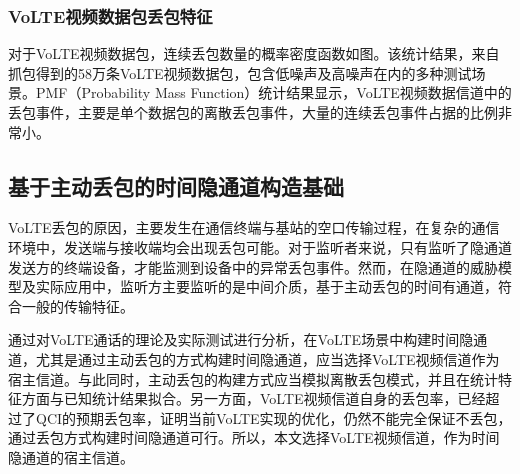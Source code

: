 \subsubsection{VoLTE视频数据包丢包特征}
\label{chap:backinfo:volte:packets:dropout}

对于VoLTE视频数据包，连续丢包数量的概率密度函数如图。该统计结果，来自抓包得到的58万条VoLTE视频数据包，包含低噪声及高噪声在内的多种测试场景。PMF（Probability Mass Function）统计结果显示，VoLTE视频数据信道中的丢包事件，主要是单个数据包的离散丢包事件，大量的连续丢包事件占据的比例非常小。

\subsection{基于主动丢包的时间隐通道构造基础}
\label{chap:backinfo:volte:scheme}
VoLTE丢包的原因，主要发生在通信终端与基站的空口传输过程，在复杂的通信环境中，发送端与接收端均会出现丢包可能。对于监听者来说，只有监听了隐通道发送方的终端设备，才能监测到设备中的异常丢包事件。然而，在隐通道的威胁模型及实际应用中，监听方主要监听的是中间介质，基于主动丢包的时间有通道，符合一般的传输特征。

通过对VoLTE通话的理论及实际测试进行分析，在VoLTE场景中构建时间隐通道，尤其是通过主动丢包的方式构建时间隐通道，应当选择VoLTE视频信道作为宿主信道。与此同时，主动丢包的构建方式应当模拟离散丢包模式，并且在统计特征方面与已知统计结果拟合。另一方面，VoLTE视频信道自身的丢包率，已经超过了QCI的预期丢包率，证明当前VoLTE实现的优化，仍然不能完全保证不丢包，通过丢包方式构建时间隐通道可行。所以，本文选择VoLTE视频信道，作为时间隐通道的宿主信道。